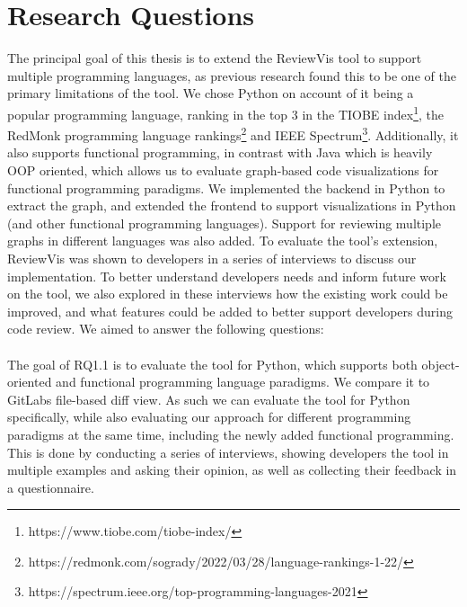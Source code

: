 \documentclass[a4paper,11pt,twoside]{article}
\theoremstyle{definition} %
\begin{document}
\newpage


\section{Research Questions} \label{Sec:ResearchQuestions}
The principal goal of this thesis is to extend the ReviewVis tool to support multiple programming languages, as previous research found this to be one of the primary limitations of the tool\citep{publication-20661, cr_visualization_major}. We chose Python on account of it being a popular programming language, ranking in the top 3 in the TIOBE index\footnote{https://www.tiobe.com/tiobe-index/}, the RedMonk programming language rankings\footnote{https://redmonk.com/sogrady/2022/03/28/language-rankings-1-22/} and IEEE Spectrum\footnote{https://spectrum.ieee.org/top-programming-languages-2021}. Additionally, it also supports functional programming, in contrast with Java which is heavily OOP oriented, which allows us to evaluate graph-based code visualizations for functional programming paradigms. We implemented the backend in Python to extract the graph, and extended the frontend to support visualizations in Python (and other functional programming languages). Support for reviewing multiple graphs in different languages was also added. To evaluate the tool's extension, ReviewVis was shown to developers in a series of interviews to discuss our implementation. To better understand developers needs and inform future work on the tool, we also explored in these interviews how the existing work could be improved, and what features could be added to better support developers during code review. We aimed to answer the following questions:
\\

\\

The goal of RQ1.1 is to evaluate the tool for Python, which supports both object-oriented and functional programming language paradigms. We compare it to GitLabs file-based diff view. As such we can evaluate the tool for Python specifically, while also evaluating our approach for different programming paradigms at the same time, including the newly added functional programming. This is done by conducting a series of interviews, showing developers the tool in multiple examples and asking their opinion, as well as collecting their feedback in a questionnaire.
\\
\end{document}
